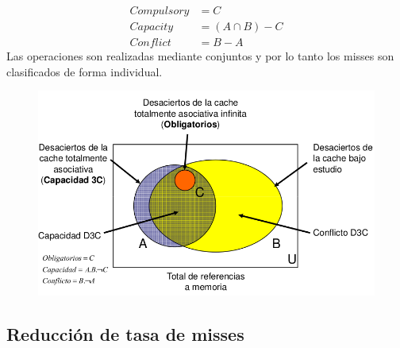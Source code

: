 \documentclass{article}
\begin{document}
\begin{align*}
    Compulsory &= C \\
    Capacity &= (A \cap B) - C \\
    Conflict &= B - A
\end{align*} 
Las operaciones son realizadas mediante conjuntos y por lo tanto los misses son clasificados de forma individual.

\begin{figure}[h!]
    \includegraphics[width=\linewidth]{imagenes/conjuntos-d3c.png}
\end{figure}

\newpage
\subsection{Reducción de tasa de misses}
\end{document}
